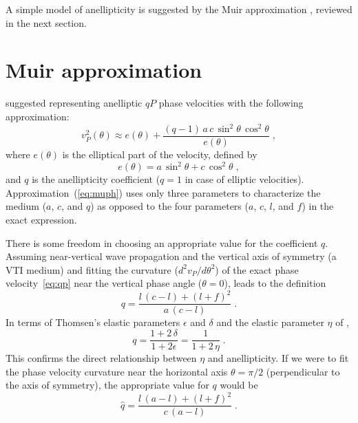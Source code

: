 
A simple model of anellipticity is suggested by the Muir approximation
\cite[]{Muir.sep.44.55,jse}, reviewed in the next section.

\section{Muir approximation}

\cite{Muir.sep.44.55} suggested representing anelliptic $qP$ phase
velocities with the following approximation:
\begin{equation}
\label{eq:muph}
  v_P^2(\theta) \approx e(\theta) + 
\frac{(q-1)\,a\,c\,
\sin^2{\theta}\,\cos^2{\theta}}{e(\theta)}
\;,
\end{equation}
where $e(\theta)$ is the elliptical part of the velocity, defined by
\begin{equation}
\label{eq:muel}
e(\theta) = a\,\sin^2{\theta} + c\,\cos^2{\theta}\;,
\end{equation}
and $q$ is the anellipticity coefficient ($q=1$ in case of elliptic
velocities). Approximation~(\ref{eq:muph}) uses only three parameters to
characterize the medium ($a$, $c$, and $q$) as opposed to the four parameters
($a$, $c$, $l$, and $f$) in the exact expression.

There is some freedom in choosing an appropriate value for the coefficient
$q$. Assuming near-vertical wave propagation and the vertical axis of symmetry
(a VTI medium) and fitting the curvature ($d^2 v_P/d \theta^2$) of the exact
phase velocity~\eqref{eq:qp} near the vertical phase angle ($\theta = 0$),
leads to the definition \cite[]{jse}
\begin{equation}
  \label{eq:qpdef}
  q = \frac{l\,(c-l) + (l+f)^2}
  {a\,(c-l)}\;.
\end{equation}
In terms of Thomsen's elastic parameters $\epsilon$ and $\delta$
\cite[]{GEO51-10-19541966} and the elastic parameter $\eta$ of
\cite{GEO60-05-15501566},
\begin{equation}
  \label{eq:eta2q}
  q = \frac{1 + 2\,\delta}{1 + 2\epsilon}
= \frac{1}{1 + 2\,\eta}\;.
\end{equation}
This confirms the direct relationship between $\eta$ and anellipticity.  If we
were to fit the phase velocity curvature near the horizontal axis
$\theta=\pi/2$ (perpendicular to the axis of symmetry), the appropriate value
for $q$ would be
\begin{equation}
  \label{eq:qpdefhat}
  \hat{q} = \frac{l\,(a-l) + (l+f)^2}
  {c\,(a-l)}\;.
\end{equation}

